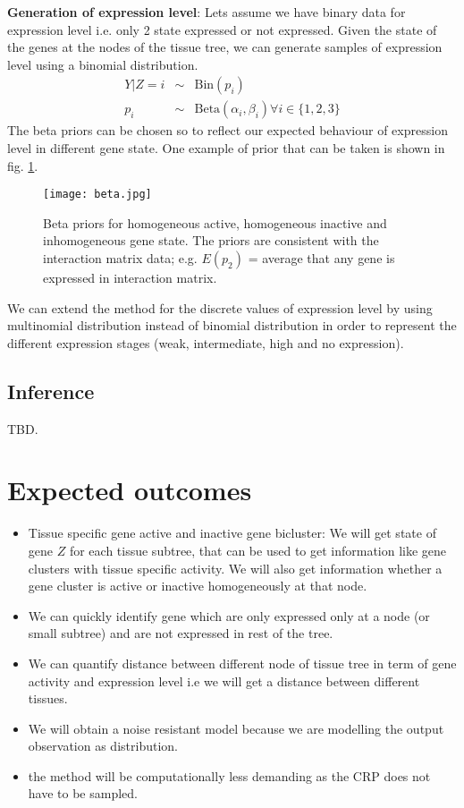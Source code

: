 \documentclass{article}
\begin{document}
\par \textbf{Generation of expression level}: Lets assume we have binary data for expression level i.e. only 2 state 
expressed or not expressed. Given the state of the genes at the nodes of the tissue tree,  we can generate samples of expression
level using a binomial distribution. 
\begin{eqnarray}
	Y|Z = i &\sim& \text{Bin}(p_i) \nonumber \\
	p_i &\sim&  \text{Beta}(\alpha_i,  \beta_i) \forall i \in \{1,2,3\}  
	\label{eqn:ydist}
\end{eqnarray}
The beta priors can be chosen so to reflect our expected behaviour of expression level in different gene state. One example of prior that can be taken
is shown in fig. \ref{fig:betaP}.
\begin{figure}[ht]
	\begin{center}
		\texttt{[image: beta.jpg]}
	\end{center}
	\caption{Beta priors for homogeneous active, homogeneous inactive and inhomogeneous gene state. The priors are consistent
	with the interaction matrix data; e.g. $E(p_2)$ = average that any gene is expressed in interaction matrix.}
	\label{fig:betaP}
\end{figure}


We can extend the method for the discrete values of expression level by using multinomial distribution instead of binomial distribution in order to represent the different expression stages (weak, intermediate, high and no expression). 
\subsection{Inference}
TBD.
\section{Expected outcomes}
\begin{itemize}
	\item Tissue specific gene active and inactive gene bicluster: We will get state of gene $Z$ for each tissue subtree, that can be used to 
		get information like gene clusters with tissue specific activity. We will also get information whether a 
		gene cluster is active or inactive homogeneously at that node.
	\item We can  quickly identify gene which are only expressed only at a node (or small subtree) and are not expressed in rest of the
		tree. 
	\item We can quantify distance between different node of tissue tree in term of gene activity and expression level i.e we will get a distance between different tissues. 
	\item We will obtain a noise resistant model because we are modelling the output observation as distribution.
	\item the method will be computationally less demanding as the CRP does not have to be sampled.
\end{itemize}

\end{document}
